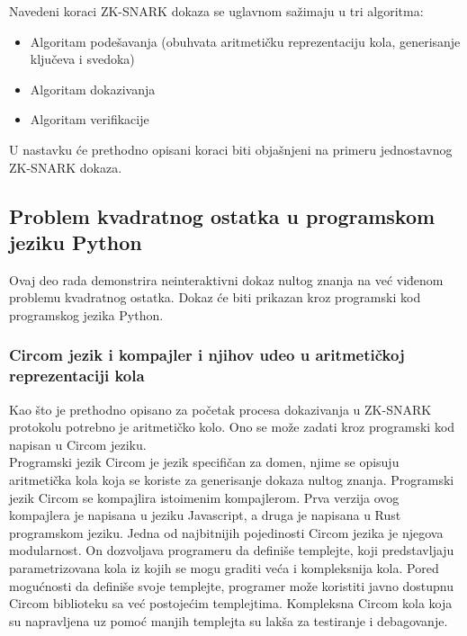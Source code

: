 	Navedeni koraci \textenglish{ZK-SNARK} dokaza se uglavnom sažimaju u tri algoritma\cite{Nitulescu2020zkSNARKsAG}:
	\begin{itemize}
		\item Algoritam podešavanja (obuhvata aritmetičku reprezentaciju kola, generisanje ključeva i svedoka)
		\item Algoritam dokazivanja 
		\item Algoritam verifikacije
	\end{itemize}
	
	U nastavku će prethodno opisani koraci biti objašnjeni na primeru jednostavnog \textenglish{ZK-SNARK} dokaza. 
    
    \subsection{Problem kvadratnog ostatka u programskom jeziku \textenglish{Python}}
    Ovaj deo rada demonstrira neinteraktivni dokaz nultog znanja na već viđenom problemu kvadratnog ostatka. Dokaz će biti prikazan kroz programski kod programskog jezika \textenglish{Python}.
    
    \subsubsection{\textenglish{Circom} jezik i kompajler i njihov udeo u aritmetičkoj reprezentaciji kola}
    Kao što je prethodno opisano za početak procesa dokazivanja u \textenglish{ZK-SNARK} protokolu potrebno je aritmetičko kolo. Ono se može zadati kroz programski kod napisan u \textenglish{Circom} jeziku.\\
    Programski jezik \textenglish{Circom}  je jezik specifičan za domen, njime se opisuju aritmetička kola koja se koriste za generisanje dokaza nultog znanja\cite{circomGH}. Programski jezik \textenglish{Circom} se kompajlira istoimenim kompajlerom. Prva verzija ovog kompajlera je napisana u jeziku \textenglish{Javascript}, a druga je napisana u \textenglish{Rust} programskom jeziku\cite{circom}. 
     Jedna od najbitnijih pojedinosti \textenglish{Circom} jezika je njegova modularnost. On dozvoljava programeru da definiše templejte, koji predstavljaju parametrizovana kola iz kojih se mogu graditi veća i kompleksnija kola. Pored mogućnosti da definiše svoje templejte, programer može koristiti javno dostupnu \textenglish{Circom} biblioteku sa već postojećim templejtima. Kompleksna \textenglish{Circom} kola koja su napravljena uz pomoć manjih templejta su lakša za testiranje i debagovanje.\\
     
